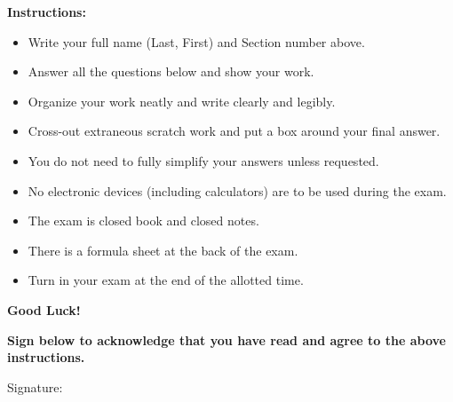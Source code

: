 \documentclass[11pt]{exam}
\begin{document}
\begin{flushleft}
\vspace{0.25in}
\textbf{Instructions:}
\begin{itemize}
    \item Write your full name (Last, First) and Section number above.
    \item Answer all the questions below and show your work.
    \item Organize your work neatly and write clearly and legibly.
    \item Cross-out extraneous scratch work and put a box around your final answer.
    \item You do not need to fully simplify your answers unless requested.
    \item No electronic devices (including calculators) are to be used during the exam.
    \item The exam is closed book and closed notes.
    \item There is a formula sheet at the back of the exam.
    \item Turn in your exam at the end of the allotted time.
\end{itemize}
\textbf{Good Luck!}

\vspace{0.25in}
\textbf{Sign below to acknowledge that you have read and agree to the above instructions.}

\vspace{0.25in}
Signature: \makebox[5.5in]{\hrulefill}\\
\end{flushleft}

\newpage
\end{document}
